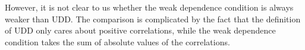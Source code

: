 \documentclass[11pt]{article}
\begin{document}
\begin{enumerate}
    However, it is not clear to us whether the weak dependence condition is always weaker than UDD.
    The comparison is complicated by the fact that the definition of UDD only cares about positive correlations, while the weak dependence condition takes the sum of absolute values of the correlations.
    

%    

\end{enumerate}
\end{document}
